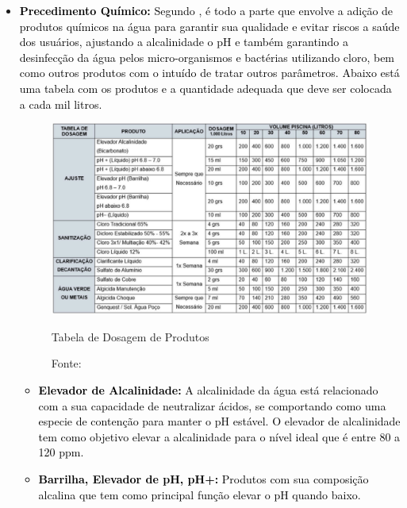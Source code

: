         \begin{itemize}
        
            \item \textbf{\textcolor{black}{Precedimento Químico:}} \textcolor{black}{Segundo \cite{guiaTratamento}, é todo a parte que envolve a adição de produtos químicos na água para garantir sua qualidade e evitar riscos a saúde dos usuários, ajustando a alcalinidade o pH e também garantindo a desinfecção da água pelos micro-organismos e bactérias utilizando cloro, bem como outros produtos com o intuído de tratar outros parâmetros. Abaixo está uma tabela com os produtos e a quantidade adequada que deve ser colocada a cada mil litros.}

                \begin{figure}[H]
                    \centering
                    \caption{ }  
                	\centering
                    \label{fig:cont}
                	\includegraphics[width=1.00\textwidth]{imagens/tabelaProdutos.png}
                    \caption*{Tabela de Dosagem de Produtos}
                	\caption*{Fonte: \cite{guiaTratamento}}
                \end{figure}
    
                \begin{itemize}
    
                    \item \textbf{\textcolor{black}{Elevador de Alcalinidade:}} \textcolor{black}{A alcalinidade da água está relacionado com a sua capacidade de neutralizar ácidos, se comportando como uma especie de contenção para manter o pH estável. O elevador de alcalinidade tem como objetivo elevar a alcalinidade para o nível ideal que é entre 80 a 120 ppm.}
    
                    \item \textbf{\textcolor{black}{Barrilha, Elevador de pH, pH+:}} \textcolor{black}{Produtos com sua composição alcalina que tem como principal função elevar o pH quando baixo.}
    

\end{itemize}
\end{itemize}
